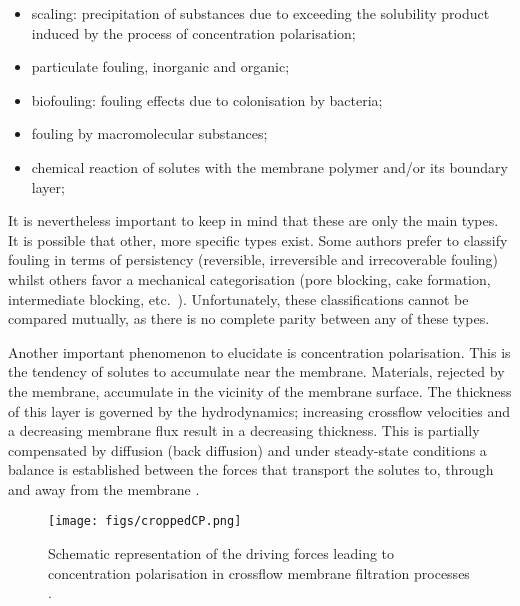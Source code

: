 \begin{itemize}
\item scaling: precipitation of substances due to exceeding the solubility product induced by the process of concentration polarisation;
\item particulate fouling, inorganic and organic;
\item biofouling: fouling effects due to colonisation by bacteria;
\item fouling by macromolecular substances;
\item chemical reaction of solutes with the membrane polymer and/or its boundary layer;
\end{itemize}  
It is nevertheless important to keep in mind that these are only the main types. It is possible that other, more specific types exist. Some authors prefer to classify fouling in terms of persistency (reversible, irreversible and irrecoverable fouling) whilst others favor a mechanical categorisation (pore blocking, cake formation, intermediate blocking, etc.\ ). Unfortunately, these classifications cannot be compared mutually, as there is no complete parity between any of these types. \par
% 
Another important phenomenon to elucidate is concentration polarisation. This is the tendency of solutes to accumulate near the membrane. Materials, rejected by the membrane, accumulate in the vicinity of the membrane surface. The thickness of this layer is governed by the hydrodynamics; increasing crossflow velocities and a decreasing membrane flux result in a decreasing thickness. This is partially compensated by diffusion (back diffusion) and under steady-state conditions a balance is established between the forces that transport the solutes to, through and away from the membrane \citep{MBRBook}. 

\begin{figure}[H]
\begin{center}
\hspace{-1.5cm}
\texttt{[image: figs/croppedCP.png]}
\caption{Schematic representation of the driving forces leading to concentration polarisation in crossflow membrane filtration processes \citep{MBRBook}.\label{CP}}
\end{center}
\end{figure}

